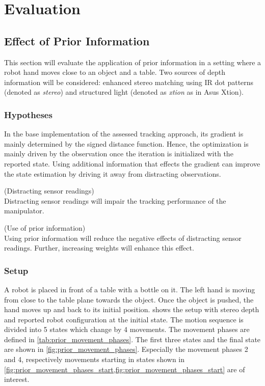 \chapter{Evaluation}

\section{Effect of Prior Information}

This section will evaluate the application of prior information in a setting where a robot hand moves close to an object and a table. Two sources of depth information will be considered: enhanced stereo matching using IR dot patterns (denoted as \emph{stereo}) and structured light (denoted as \emph{xtion} as in Asus Xtion).

\subsection{Hypotheses}

In the base implementation of the assessed tracking approach, its gradient is mainly determined by the signed distance function. Hence, the optimization is mainly driven by the observation once the iteration is initialized with the reported state. Using additional information that effects the gradient can improve the state estimation by driving it away from distracting observations.

\begin{hypothesis}(Distracting sensor readings)\\
Distracting sensor readings will impair the tracking performance of the manipulator.
\label{hyp:distracting_readings}
\end{hypothesis}

\begin{hypothesis}(Use of prior information)\\
Using prior information will reduce the negative effects of distracting sensor readings. Further, increasing weights will enhance this effect.
\label{hyp:prior_information}
\end{hypothesis}


\subsection{Setup}

A robot is placed in front of a table with a bottle on it. The left hand is moving from close to the table plane towards the object. Once the object is pushed, the hand moves up and back to its initial position.
 shows the setup with stereo depth and reported robot configuration at the initial state.
The motion sequence is divided into 5 states which change by 4 movements. The movement phases are defined in \cref{tab:prior_movement_phases}. The first three states and the final state are shown in \cref{fig:prior_movement_phases}.
Especially the movement phases 2 and 4, respectively movements starting in states shown in \cref{fig:prior_movement_phases_start,fig:prior_movement_phases_start} are of interest.

